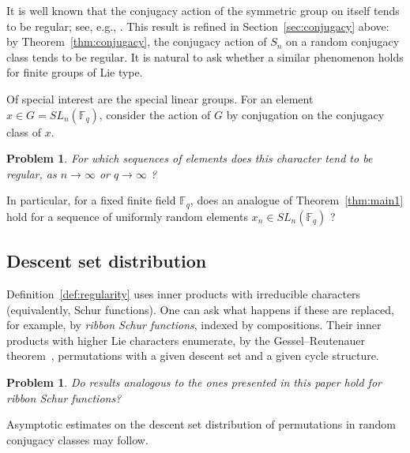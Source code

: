 \documentclass[12pt]%
{amsart}
\newcommand{\FF}{\mathbb{F}}
\theoremstyle{plain}
\newtheorem{problem}[theorem]{Problem}
\theoremstyle{definition}
\theoremstyle{remark}
\newcommand{\todo}[1]{\vspace{5 mm}\par \noindent
	\marginpar{\textsc{ToDo}} \framebox{\begin{minipage}[c]{0.95
				\textwidth}
			#1 \end{minipage}}\vspace{5 mm}\par}
\begin{document}
It is well known that the conjugacy action of the symmetric group on itself tends to be regular; see, e.g., \cite{AF, R96}. 
This result is refined in Section~\ref{sec:conjugacy} above: 
by Theorem~\ref{thm:conjugacy}, the conjugacy action of $S_n$ on a random conjugacy class tends to be regular. 
It is natural to ask whether a similar phenomenon holds for finite groups of Lie type.  

Of special interest are the special linear groups.   
For an element $x\in G=SL_n(\FF_q)$, consider the action of $G$ by conjugation on the conjugacy class  of $x$. 
      
\begin{problem} 
    For which sequences of elements does this character tend 
    to be regular, 
    as $n\rightarrow \infty$ or $q\rightarrow \infty$ ?
\end{problem}

In particular, for a fixed finite field $\FF_q$, does an analogue of Theorem~\ref{thm:main1} hold for a sequence of uniformly random elements $x_n \in SL_n(\FF_q)$ ?


\subsection{Descent set distribution}

Definition~\ref{def:regularity} uses inner products with irreducible characters (equivalently, Schur functions). 
One can ask what happens if these are replaced, for example, by {\em ribbon Schur functions}, indexed by compositions.
Their inner products with higher Lie characters enumerate, by the Gessel--Reutenauer theorem~\cite[Theorem 2.1]{GR93}, permutations with a given descent set and a given cycle structure. 

\begin{problem}
    Do results analogous to the ones presented in this paper hold for ribbon Schur functions?
\end{problem}

    Asymptotic estimates on the descent set distribution of permutations in random conjugacy classes may follow. 
\end{document}
